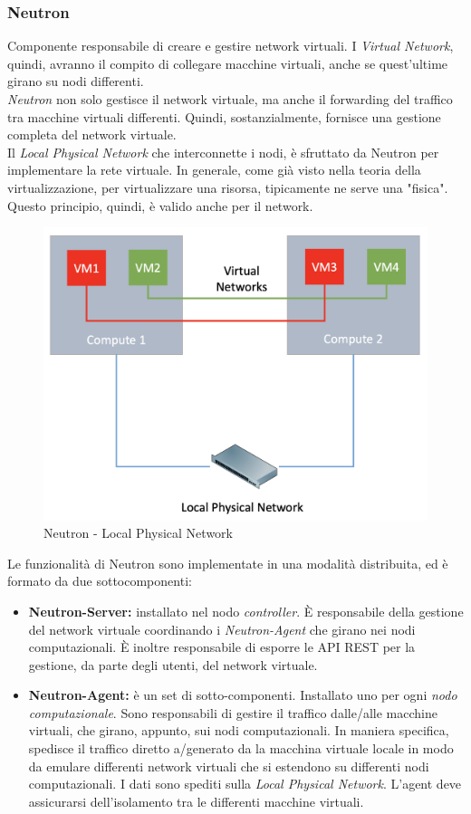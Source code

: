 \documentclass{article}
\begin{document}
\subsubsection{Neutron}
Componente responsabile di creare e gestire network virtuali. I \textit{Virtual Network}, quindi, avranno il compito di collegare macchine virtuali, anche se quest'ultime girano su nodi differenti. \\
\textit{Neutron} non solo gestisce il network virtuale, ma anche il forwarding del traffico tra macchine virtuali differenti. Quindi, sostanzialmente, fornisce una gestione completa del network virtuale. \\
Il \textit{Local Physical Network} che interconnette i nodi, è sfruttato da Neutron per implementare la rete virtuale. In generale, come già visto nella teoria della virtualizzazione, per virtualizzare una risorsa, tipicamente ne serve una "fisica". Questo principio, quindi, è valido anche per il network. 
\begin{figure}[H]
    \centering
    \includegraphics[scale=0.2]{img/neutron local physical.png}
    \caption{Neutron - Local Physical Network}
\end{figure}\noindent
Le funzionalità di Neutron sono implementate in una modalità distribuita, ed è formato da due sottocomponenti:
\begin{itemize}
    \item \textbf{Neutron-Server:} installato nel nodo \textit{controller}. È responsabile della gestione del network virtuale coordinando i \textit{Neutron-Agent} che girano nei nodi computazionali. È inoltre responsabile di esporre le API REST per la gestione, da parte degli utenti, del network virtuale.
    \item \textbf{Neutron-Agent:} è un set di sotto-componenti. Installato uno per ogni \textit{nodo computazionale}. Sono responsabili di gestire il traffico dalle/alle macchine virtuali, che girano, appunto, sui nodi computazionali. In maniera specifica, spedisce il traffico diretto a/generato da la macchina virtuale locale in modo da emulare differenti network virtuali che si estendono su differenti nodi computazionali. I dati sono spediti sulla \textit{Local Physical Network}. L'agent deve assicurarsi dell'isolamento tra le differenti macchine virtuali.
\end{itemize}
\end{document}
